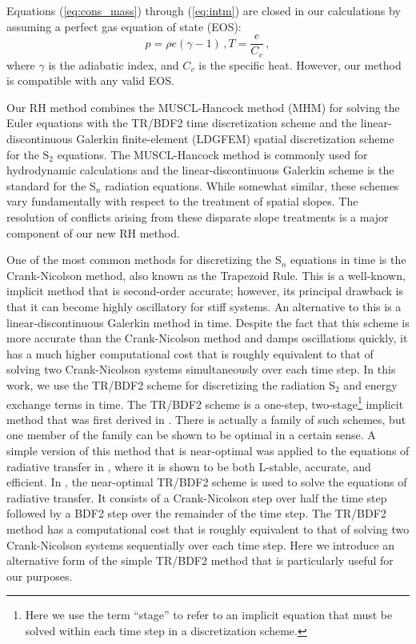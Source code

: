 \documentclass[preprint,12pt]{elsarticle}
\newcommand{\be}{\begin{equation}}
\newcommand{\ee}{\end{equation}}
\newcommand{\pec}{\, ,}
\newcommand{\lequ}[1]{\label{eq:#1}}
\newcommand{\requ}[1]{(\ref{eq:#1})}
\begin{document}
Equations \requ{cons_mass} through \requ{intm} are closed in our calculations by assuming
a perfect gas equation of state (EOS):
\begin{subequations}
\be
p=\rho e (\gamma -1)
\lequ{pressure}
\pec
\ee
\be
T = \frac{e}{C_v} \pec
\lequ{mattemp}
\ee
\end{subequations}
where $\gamma$ is the adiabatic index, and $C_v$ is the specific heat.  However, our method is compatible with any valid EOS. 

Our RH method combines the MUSCL-Hancock method (MHM) for solving the Euler equations with the TR/BDF2 time discretization 
scheme and the linear-discontinuous Galerkin finite-element (LDGFEM) spatial discretization scheme for the S$_2$ equations.  
The MUSCL-Hancock method is commonly used for hydrodynamic calculations and the linear-discontinuous Galerkin scheme is the 
standard for the S$_n$ radiation equations.  While somewhat similar, these schemes vary fundamentally with respect to the 
treatment of spatial slopes.  The resolution of conflicts arising from these disparate 
slope treatments is a major component of our new RH method.

One of the most common methods for discretizing the S$_n$ equations in time is the Crank-Nicolson method, also known as the 
Trapezoid Rule. This is a well-known, implicit method that is second-order accurate; however, its principal drawback is that 
it can become highly oscillatory for stiff systems.  An alternative to this is a linear-discontinuous Galerkin method in time.  
Despite the fact that this scheme is more accurate than the Crank-Nicolson method and damps oscillations quickly, it has a 
much higher computational cost that is roughly equivalent to that of solving two Crank-Nicolson systems simultaneously over 
each time step.  In this work, we use the TR/BDF2 scheme for discretizing the radiation S$_2$ and energy exchange terms in time.  
The TR/BDF2 scheme is a one-step, two-stage\footnote{Here we use the term ``stage'' to refer to an implicit equation that must 
be solved within each time step in a discretization scheme.} implicit method that was first derived in \cite{bank}.   There is 
actually a family of such schemes, but one member of the family can be shown to be optimal in a certain sense.  A simple version 
of this method that is near-optimal was applied to the equations of radiative transfer in \cite{EM2011}, where it is shown to be 
both L-stable, accurate, and efficient.  In \cite{EM2011}, the near-optimal TR/BDF2 scheme is used to solve the equations of 
radiative transfer. It consists of a Crank-Nicolson step over half the time step followed by a BDF2 step over 
the remainder of the time step.  The TR/BDF2 method has a computational cost that is roughly equivalent to that of solving two 
Crank-Nicolson systems sequentially over each time step.  Here we introduce an alternative form 
of the simple TR/BDF2 method that is particularly useful for our purposes.  
\end{document}
